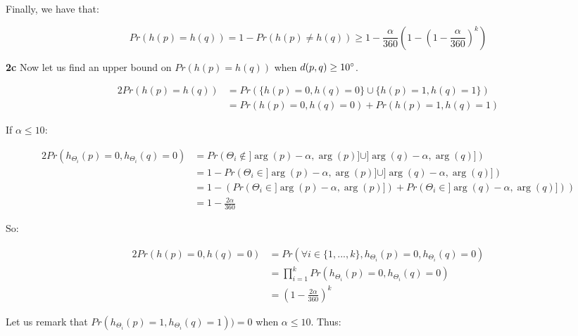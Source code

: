 \documentclass[10pt,a4paper]{article}
\theoremstyle{plain}
\begin{document}
Finally, we have that:

$$
Pr(h(p) = h(q)) = 1 - Pr(h(p) \neq h(q)) \geq 1 - \frac{\alpha}{360}\left(1 - \left(1 - \frac{\alpha}{360}\right)^k\right)
$$

\textbf{2c} Now let us find an upper bound on $Pr(h(p) = h(q))$ when $d(p, q) \geq 10\degree$.

\begin{alignat*}{2}
Pr(h(p) = h(q)) & = Pr(\{h(p) = 0, h(q) = 0\} \cup \{h(p) = 1, h(q) = 1\}) \\
& = Pr(h(p) = 0, h(q) = 0) + Pr(h(p) = 1, h(q) = 1)
\end{alignat*}

If $\alpha \leq 10$:

\begin{alignat*}{2}
Pr(h_{\Theta_i}(p) = 0, h_{\Theta_i}(q) = 0) & = Pr(\Theta_i \not \in ]\arg(p)-\alpha, \arg(p)] \cup ]\arg(q)-\alpha, \arg(q)]) \\
& = 1 - Pr(\Theta_i \in ]\arg(p)-\alpha, \arg(p)] \cup ]\arg(q)-\alpha, \arg(q)]) \\
& = 1 - (Pr(\Theta_i \in ]\arg(p)-\alpha, \arg(p)]) + Pr(\Theta_i \in ]\arg(q)-\alpha, \arg(q)])) \\
& = 1 - \frac{2\alpha}{360}
\end{alignat*}

So:

\begin{alignat*}{2}
Pr(h(p) = 0, h(q) = 0) & = Pr(\forall i \in \{1, ..., k\}, h_{\Theta_i}(p) = 0, h_{\Theta_i}(q) = 0) \\
& = \prod_{i=1}^k{Pr(h_{\Theta_i}(p) = 0, h_{\Theta_i}(q) = 0)} \\
& = \left(1 - \frac{2\alpha}{360}\right)^k
\end{alignat*}

Let us remark that $Pr(h_{\Theta_i}(p) = 1, h_{\Theta_i}(q) = 1)) = 0$ when $\alpha \leq 10$. Thus:
\end{document}
